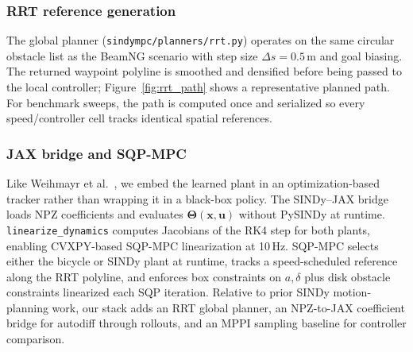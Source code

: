 \documentclass[letterpaper, 10 pt, conference]{ieeeconf}  %
\begin{document}

\subsubsection{RRT reference generation}
The global planner (\texttt{sindympc/planners/rrt.py}) operates on the same circular obstacle list as the BeamNG scenario with step size $\Delta s = 0.5$\,m and goal biasing.
The returned waypoint polyline is smoothed and densified before being passed to the local controller; Figure~\ref{fig:rrt_path} shows a representative planned path.
For benchmark sweeps, the path is computed once and serialized so every speed/controller cell tracks identical spatial references.

\subsubsection{JAX bridge and SQP-MPC}
Like Weihmayr et al.~\cite{Weihmayr2025SINDyMPC}, we embed the learned plant in an optimization-based tracker rather than wrapping it in a black-box policy.
The SINDy--JAX bridge loads NPZ coefficients and evaluates $\boldsymbol{\Theta}(\mathbf{x}, \mathbf{u})$ without PySINDy at runtime.
\texttt{linearize\_dynamics} computes Jacobians of the RK4 step for both plants, enabling CVXPY-based SQP-MPC linearization at 10\,Hz.
SQP-MPC selects either the bicycle or SINDy plant at runtime, tracks a speed-scheduled reference along the RRT polyline, and enforces box constraints on $a, \delta$ plus disk obstacle constraints linearized each SQP iteration.
Relative to prior SINDy motion-planning work, our stack adds an RRT global planner, an NPZ-to-JAX coefficient bridge for autodiff through rollouts, and an MPPI sampling baseline for controller comparison.
\end{document}
